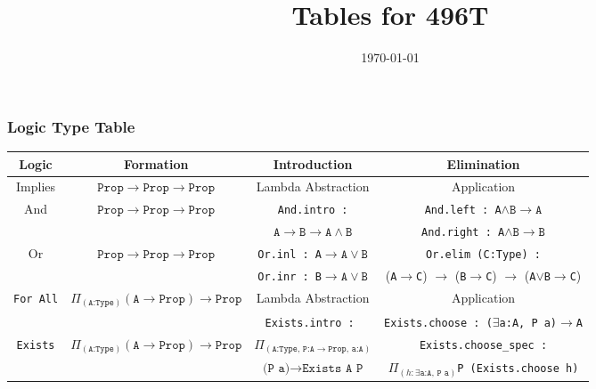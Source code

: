 \documentclass{beamer}
\title{Tables for 496T}
\institute{The University of Arizona}
\date{\today}
\begin{document}
\newcommand{\lean}[1]{\texttt{#1}}


\frame{\titlepage}



\begin{frame}
\tiny
\frametitle{Logic Type Table}
    \begin{center}
    \begin{tabular}{|c||c|c|c|}
        \hline
        Logic & Formation & Introduction & Elimination  \\
        \hline
        \hline
        Implies & $\lean{Prop}\to\lean{Prop}\to\lean{Prop}$ 
                & Lambda Abstraction
                & Application \\
        \hline
        And & $\lean{Prop}\to\lean{Prop}\to\lean{Prop}$ 
            & \lean{And.intro :}
            & \lean{And.left : A}$\wedge\lean{B}\to\lean{A}$
            \\
        
        $ $ & $ $ &  
                $\lean{A}\to\lean{B}\to\lean{A}\wedge\lean{B}$ & 
                \lean{And.right : A}$\wedge\lean{B}\to\lean{B}$ \\
        \hline
        Or & $\lean{Prop}\to\lean{Prop}\to\lean{Prop}$ 
           & \lean{Or.inl : A}$\to\lean{A}\vee\lean{B}$
           & \lean{Or.elim (C:Type) :} 
           \\

        $ $ & $ $ & \lean{Or.inr : B}$\to\lean{A}\vee\lean{B}$ 
                  & (\lean{A}$\to$\lean{C}) $\to$ 
                    (\lean{B}$\to$\lean{C}) $\to$ 
                    (\lean{A}$\vee$\lean{B}$\to$\lean{C}) \\
        \hline
        \lean{For All} & $\Pi_{(\lean{A:Type})} (\lean{A}\to\lean{Prop})\to\lean{Prop}$
                  & Lambda Abstraction 
                  & Application 
                  \\
        \hline
                  & 
                  & \lean{Exists.intro : }
                  & \lean{Exists.choose : ($\exists$a:A, P a)$\to$A} \\

        \lean{Exists} & $\Pi_{(\lean{A:Type})} (\lean{A}\to\lean{Prop})\to\lean{Prop}$
        & $\Pi_{(\lean{A:Type, P:A}\to\lean{Prop, a:A})}$ & \lean{Exists.choose\_spec :} \\
        & & $\lean{(P a)}\to\lean{Exists A P}$ & 
        $\Pi_{(h : \exists \lean{a:A, P a})}$\lean{P (Exists.choose h)}\\
        \hline

    
    \end{tabular}
    \end{center}

\end{frame}
\end{document}
